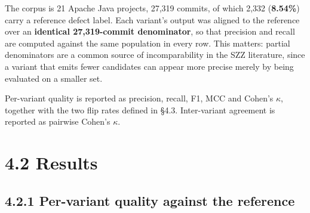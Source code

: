 The corpus is 21 Apache Java projects, 27,319 commits, of which 2,332
(\textbf{8.54\%}) carry a reference defect label. Each variant's output
was aligned to the reference over an \textbf{identical 27,319-commit
denominator}, so that precision and recall are computed against the same
population in every row. This matters: partial denominators are a common
source of incomparability in the SZZ literature, since a variant that
emits fewer candidates can appear more precise merely by being evaluated
on a smaller set.

Per-variant quality is reported as precision, recall, F1, MCC and
Cohen's \ensuremath{\kappa}, together with the two flip rates defined in \S{}4.3.
Inter-variant agreement is reported as pairwise Cohen's \ensuremath{\kappa}.

\section{4.2 Results}\label{results}

\subsection{4.2.1 Per-variant quality against the
reference}\label{per-variant-quality-against-the-reference}

